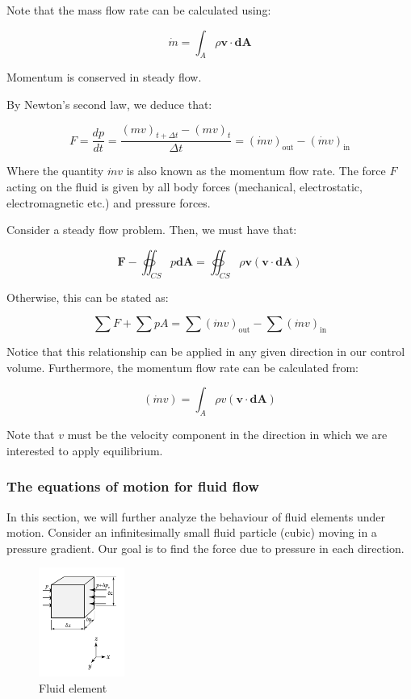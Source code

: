 \documentclass{article}
\begin{document}
Note that the mass flow rate can be calculated using:

\[ \dot{m} = \int_A \rho \textbf{v} \cdot \textbf{dA} \]

\begin{proposition}
    Momentum is conserved in steady flow.
\end{proposition}

By Newton's second law, we deduce that:

\[ F = \frac{dp}{dt} = \frac{(mv)_{t + \Delta t} - (mv)_t}{\Delta t} = (\dot{m}v)_{\text{out}} - (\dot{m}v)_{\text{in}} \]

Where the quantity $\dot{m}v$ is also known as the momentum flow rate. The force $F$ acting on the fluid is given by all body forces (mechanical, electrostatic, electromagnetic etc.) and pressure forces. 

\begin{proposition}
    Consider a steady flow problem. Then, we must have that:

    \[ \textbf{F} - \oiint_{CS} p\textbf{dA} = \oiint_{CS} \rho \textbf{v} (\textbf{v} \cdot \textbf{dA}) \]

    Otherwise, this can be stated as:

    \[ \sum F + \sum pA = \sum (\dot{m}v)_{\text{out}} - \sum (\dot{m}v)_{\text{in}} \]

    Notice that this relationship can be applied in any given direction in our control volume. Furthermore, the momentum flow rate can be calculated from:

    \[ (\dot{m}v) = \int_A \rho v (\textbf{v} \cdot \textbf{dA})  \]

    Note that $v$ must be the velocity component in the direction in which we are interested to apply equilibrium.
\end{proposition}

\newpage

\subsubsection{The equations of motion for fluid flow}

In this section, we will further analyze the behaviour of fluid elements under motion. Consider an infinitesimally small fluid particle (cubic) moving in a pressure gradient. Our goal is to find the force due to pressure in each direction.

\begin{figure}[h]
    \centering
    \includegraphics[width = 0.25\textwidth]{images/Screenshot 2024-02-20 at 17.32.41.png}
    \caption{Fluid element}
    \label{fig:enter-label}
\end{figure}
\end{document}
